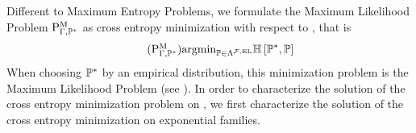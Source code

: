 
Different to Maximum Entropy Problems, we formulate the Maximum Likelihood Problem $\mathrm{P}^{\mathrm{M}}_{\Gamma,\mathbb{P}^*}$ as cross entropy minimization with respect to \HybridLogicNetworks{}, that is
\begin{align}
    \label{prob:minCrossEntropyHLN}\tag{$\probtagtypeinst{\mathrm{M}}{\Gamma,\gendistribution}$}
    \argmin_{\probtensor\in\elrealizabledistsof{\mlnstat}} \centropyof{\gendistribution}{\probtensor}
\end{align}
When choosing $\mathbb{P}^*$ by an empirical distribution, this minimization problem is the Maximum Likelihood Problem (see ).
In order to characterize the solution of the cross entropy minimization problem on \HybridLogicNetworks{}, we first characterize the solution of the cross entropy minimization on exponential families.

